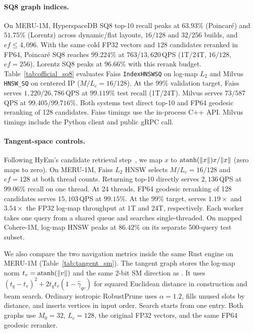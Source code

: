 \paragraph{SQ8 graph indices.}
On {MERU-1M}, HyperspaceDB SQ8 top-10 recall peaks at $63.93\%$ (Poincar\'e) and $51.75\%$ (Lorentz) across dynamic/flat layouts, $16/128$ and $32/256$ builds, and $ef\le4{,}096$. With the same cold FP32 vectors and $128$ candidates reranked in FP64, Poincar\'e SQ8 reaches $99.224\%$ at $763$/$13{,}620$\,QPS (1T/24T, $16/128$, $ef=256$). Lorentz SQ8 peaks at $96.66\%$ with this rerank budget.
Table~\ref{tab:official_sq8} evaluates Faiss \texttt{IndexHNSWSQ} on log-map $L_2$ and Milvus \texttt{HNSW\_SQ} on centered IP ($M/L_c=16/128$). At the $99\%$ validation target, Faiss serves $1{,}220/26{,}786$\,QPS at $99.119\%$ test recall (1T/24T). Milvus serves $73/587$\,QPS at $99.405/99.716\%$. Both systems test direct top-10 and FP64 geodesic reranking of 128 candidates. Faiss timings use the in-process C++ API. Milvus timings include the Python client and public gRPC call.



\paragraph{Tangent-space controls.}
Following {HyEm}'s candidate retrieval step~\cite{deng2026hyem}, we map $x$ to $\operatorname{atanh}(\|x\|)x/\|x\|$ (zero maps to zero). On {MERU-1M}, {Faiss} $L_2$ HNSW selects $M/L_c=16/128$ and $ef=128$ at both thread counts. Returning top-10 directly serves $2{,}136$\,QPS at $99.06\%$ recall on one thread. At 24 threads, FP64 geodesic reranking of 128 candidates serves $15{,}103$\,QPS at $99.15\%$. At the $99\%$ target, \rquiver{} serves $1.19\times$ and $3.54\times$ the FP32 log-map throughput at 1T and 24T, respectively. Each worker takes one query from a shared queue and searches single-threaded. On mapped {Cohere-1M}, log-map HNSW peaks at $86.42\%$ on its separate 500-query test subset.

We also compare the two navigation metrics inside the same Rust engine on {MERU-1M} (Table~\ref{tab:tangent_sm}). The tangent graph stores the log-map norm $t_v=\operatorname{atanh}(\|v\|)$ and the same 2-bit {SM} direction as \rquiver{}. It uses $(t_q-t_v)^2+2t_qt_v(1-\hat\gamma_{qv})$ for squared Euclidean distance in construction and beam search. Ordinary isotropic RobustPrune uses $\alpha=1.2$, fills unused slots by distance, and inserts vertices in input order. Search starts from one entry. Both graphs use $M_0=32$, $L_c=128$, the original FP32 vectors, and the same FP64 geodesic reranker.

